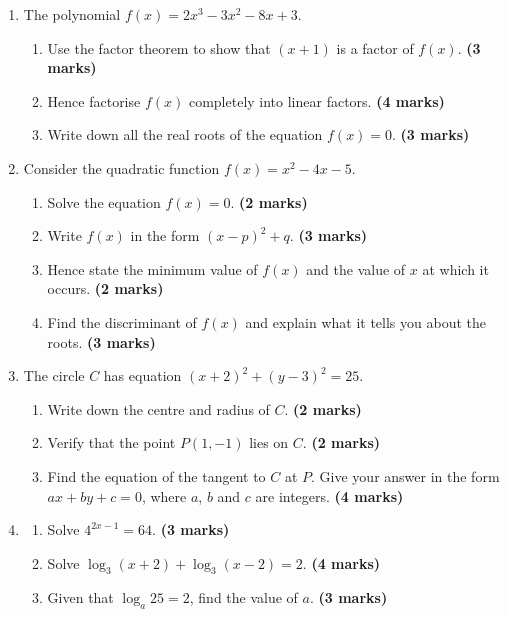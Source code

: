 \documentclass{sbs-exam}
\def\imarks#1{\hfill\textbf{(#1 marks)}}
\begin{document}
\begin{enumerate}

\item %
The polynomial $f(x) = 2x^3 - 3x^2 - 8x + 3$.
\begin{enumerate}
    \item Use the factor theorem to show that $(x+1)$ is a factor of $f(x)$. \imarks{3}
    \item Hence factorise $f(x)$ completely into linear factors. \imarks{4}
    \item Write down all the real roots of the equation $f(x)=0$. \imarks{3}
\end{enumerate}
\vspace{6cm}

\item %
Consider the quadratic function $f(x) = x^2 - 4x - 5$.
\begin{enumerate}
    \item Solve the equation $f(x)=0$. \imarks{2}
    \item Write $f(x)$ in the form $(x-p)^2 + q$. \imarks{3}
    \item Hence state the minimum value of $f(x)$ and the value of $x$ at which it occurs. \imarks{2}
    \item Find the discriminant of $f(x)$ and explain what it tells you about the roots. \imarks{3}
\end{enumerate}
\vspace{8cm}

\item %
The circle $C$ has equation $(x+2)^2 + (y-3)^2 = 25$.
\begin{enumerate}
    \item Write down the centre and radius of $C$. \imarks{2}
    \item Verify that the point $P(1,-1)$ lies on $C$. \imarks{2}
    \item Find the equation of the tangent to $C$ at $P$. Give your answer in the form $ax+by+c=0$, where $a$, $b$ and $c$ are integers. \imarks{4}
\end{enumerate}
\vspace{6cm}

\item %
\begin{enumerate}
    \item Solve $4^{2x-1} = 64$. \imarks{3}
    \item Solve $\log_3(x+2) + \log_3(x-2) = 2$. \imarks{4}
    \item Given that $\log_a 25 = 2$, find the value of $a$. \imarks{3}
\end{enumerate}
\vspace{6cm}

\end{enumerate}
\end{document}
